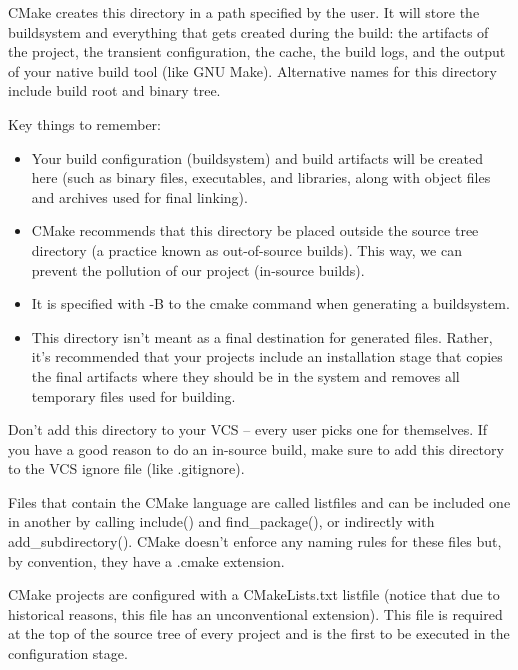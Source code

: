 CMake creates this directory in a path specified by the user. It will store the buildsystem and everything that gets created during the build: the artifacts of the project, the transient configuration, the cache, the build logs, and the output of your native build tool (like GNU Make). Alternative names for this directory include build root and binary tree.

Key things to remember:

\begin{itemize}
\item
Your build configuration (buildsystem) and build artifacts will be created here (such as binary files, executables, and libraries, along with object files and archives used for final linking).

\item
CMake recommends that this directory be placed outside the source tree directory (a practice known as out-of-source builds). This way, we can prevent the pollution of our project (in-source builds).

\item
It is specified with -B to the cmake command when generating a buildsystem.

\item
This directory isn’t meant as a final destination for generated files. Rather, it’s recommended that your projects include an installation stage that copies the final artifacts where they should be in the system and removes all temporary files used for building.
\end{itemize}

Don’t add this directory to your VCS – every user picks one for themselves. If you have a good reason to do an in-source build, make sure to add this directory to the VCS ignore file (like .gitignore).



Files that contain the CMake language are called listfiles and can be included one in another by calling include() and find\_package(), or indirectly with add\_subdirectory(). CMake doesn’t enforce any naming rules for these files but, by convention, they have a .cmake extension.


CMake projects are configured with a CMakeLists.txt listfile (notice that due to historical reasons, this file has an unconventional extension). This file is required at the top of the source tree of every project and is the first to be executed in the configuration stage.


